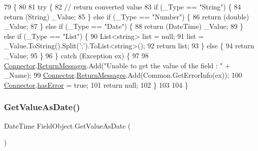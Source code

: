 \begin{DoxyCode}
79                              \{
80 
81         \textcolor{keywordflow}{try} \{
82             \textcolor{comment}{// return converted value}
83             \textcolor{keywordflow}{if} (\_Type == \textcolor{stringliteral}{"String"}) \{
84                 \textcolor{keywordflow}{return} (String) \_Value;
85             \} \textcolor{keywordflow}{else} \textcolor{keywordflow}{if} (\_Type == \textcolor{stringliteral}{"Number"}) \{
86                 \textcolor{keywordflow}{return} (\textcolor{keywordtype}{double}) \_Value;
87             \} \textcolor{keywordflow}{else} \textcolor{keywordflow}{if} (\_Type == \textcolor{stringliteral}{"Date"}) \{
88                 \textcolor{keywordflow}{return} (DateTime) \_Value;
89             \} \textcolor{keywordflow}{else} \textcolor{keywordflow}{if} (\_Type == \textcolor{stringliteral}{"List"}) \{
90                 List<string> list = null;
91                 list = \_Value.ToString().Split(\textcolor{charliteral}{';'}).ToList<\textcolor{keywordtype}{string}>();
92                 \textcolor{keywordflow}{return} list;
93             \} \textcolor{keywordflow}{else} \{
94                 \textcolor{keywordflow}{return} \_Value;
95             \}
96         \} \textcolor{keywordflow}{catch} (Exception ex) \{
97 
98             \mbox{\hyperlink{class_connector}{Connector}}.\mbox{\hyperlink{class_connector_a1ed422674b344524fd77998dcf6a9ba6}{ReturnMessages}}.Add(\textcolor{stringliteral}{"Unable to get the value of the field : "} +
       \_Name);
99             \mbox{\hyperlink{class_connector}{Connector}}.\mbox{\hyperlink{class_connector_a1ed422674b344524fd77998dcf6a9ba6}{ReturnMessages}}.Add(Common.GetErrorInfo(ex));
100             \mbox{\hyperlink{class_connector}{Connector}}.\mbox{\hyperlink{class_connector_a079bae21a5417efa53bfe8954c0f533f}{hasError}} = \textcolor{keyword}{true};
101             \textcolor{keywordflow}{return} null;
102         \}
103       
104     \}
\end{DoxyCode}
\mbox{\label{class_field_object_a797ebc6615a86bafd9bd17f09562f2ee}} 
\subsubsection{\texorpdfstring{Get\+Value\+As\+Date()}{GetValueAsDate()}}
{\footnotesize\ttfamily Date\+Time Field\+Object.\+Get\+Value\+As\+Date (\begin{DoxyParamCaption}{ }\end{DoxyParamCaption})}



